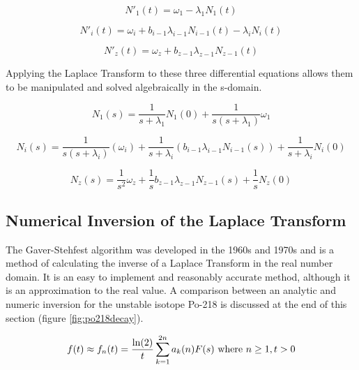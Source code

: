 \documentclass[12pt,twoside]{manual}
\begin{document}
\begin{equation}
N'_{1}(t) = \omega_{1} - \lambda_{1} N_{1} (t)
\end{equation}

\begin{equation}
N'_{i}(t) = \omega_{i} + b_{i-1} \lambda_{i-1} N_{i-1} (t) - \lambda_{i} N_{i} (t)
\end{equation}

\begin{equation}
N'_{z}(t) =  \omega_{z} + b_{z-1} \lambda_{z-1} N_{z-1} (t)
\end{equation}

Applying the Laplace Transform to these three differential equations allows them to be manipulated and solved algebraically in the s-domain.

\begin{equation}
N_{1}(s) = \frac{1}{s+\lambda_{1}} N_{1}(0) + \frac{1}{s(s+\lambda_{1})} \omega_{1}
\end{equation}

\begin{equation}
N_{i}(s) = \frac{1}{s ( s+ \lambda_{i})} \left(\omega_{i} \right) + \frac{1}{s+ \lambda_{i}} \left( b_{i-1} \lambda_{i-1} N_{i-1} (s) \right) + \frac{1}{s+ \lambda_{i}} N_{i} (0)
\end{equation}

\begin{equation}
N_{z}(s) = \frac{1}{s^2} \omega_{z} + \frac{1}{s} b_{z-1} \lambda_{z-1} N_{z-1} (s) + \frac{1}{s} N_{z}(0)
\end{equation}


\subsection{Numerical Inversion of the Laplace Transform}

The Gaver-Stehfest\cite{stehfest} algorithm was developed in the 1960s and 1970s and is a method of calculating the inverse of a Laplace Transform in the real number domain.  It is an easy to implement and reasonably accurate method, although it is an approximation to the real value.  A comparison between an analytic and numeric inversion for the unstable isotope Po-218 is discussed at the end of this section (figure \ref{fig:po218decay}).

\begin{equation}
f(t) \approx f_{n}(t) = \frac{\ln(2)}{t} \sum_{k=1}^{2n} a_{k}(n)F(s) \textnormal{ where } n \ge 1, t>0
\end{equation}
\end{document}
